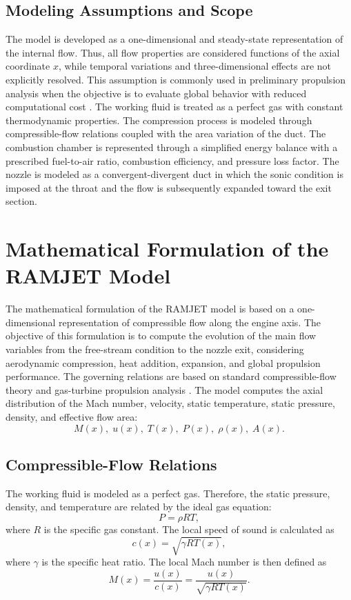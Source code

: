 \documentclass[preprint,12pt]{elsarticle}
\begin{document}
\subsection{Modeling Assumptions and Scope}
The model is developed as a one-dimensional and steady-state representation of the internal flow. Thus, all flow properties are considered functions of the axial coordinate $x$, while temporal variations and three-dimensional effects are not explicitly resolved. This assumption is commonly used in preliminary propulsion analysis when the objective is to evaluate global behavior with reduced computational cost \cite{Hill1992,Mattingly2006}.
The working fluid is treated as a perfect gas with constant thermodynamic properties. The compression process is modeled through compressible-flow relations coupled with the area variation of the duct. The combustion chamber is represented through a simplified energy balance with a prescribed fuel-to-air ratio, combustion efficiency, and pressure loss factor. The nozzle is modeled as a convergent-divergent duct in which the sonic condition is imposed at the throat and the flow is subsequently expanded toward the exit section.
\section{Mathematical Formulation of the RAMJET Model}
\label{sec:mathematical_formulation}
The mathematical formulation of the RAMJET model is based on a one-dimensional representation of compressible flow along the engine axis. The objective of this formulation is to compute the evolution of the main flow variables from the free-stream condition to the nozzle exit, considering aerodynamic compression, heat addition, expansion, and global propulsion performance. The governing relations are based on standard compressible-flow theory and gas-turbine propulsion analysis \cite{Anderson1990,Hill1992,Mattingly2006}.
The model computes the axial distribution of the Mach number, velocity, static temperature, static pressure, density, and effective flow area:
\begin{equation}
M(x),\; u(x),\; T(x),\; P(x),\; \rho(x),\; A(x).
\end{equation}
\subsection{Compressible-Flow Relations}
The working fluid is modeled as a perfect gas. Therefore, the static pressure, density, and temperature are related by the ideal gas equation:
\begin{equation}
P = \rho R T,
\end{equation}
where $R$ is the specific gas constant.
The local speed of sound is calculated as
\begin{equation}
c(x)=\sqrt{\gamma R T(x)},
\end{equation}
where $\gamma$ is the specific heat ratio. The local Mach number is then defined as
\begin{equation}
M(x)=\frac{u(x)}{c(x)}
=\frac{u(x)}{\sqrt{\gamma R T(x)}}.
\end{equation}
\end{document}
